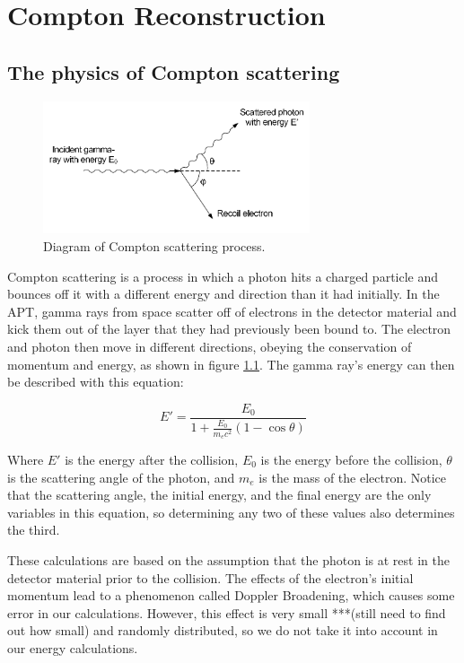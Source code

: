 %
\chapter{Compton Reconstruction}

\section{The physics of Compton scattering}

\begin{figure}
    \centering
    \includegraphics[width=0.7\textwidth]{Compton_scatter.png}
    \caption{Diagram of Compton scattering process. \cite{comptonThesis}}
    \label{fig:compton_scatter}
\end{figure}

Compton scattering is a process in which a photon hits a charged particle and bounces off it with a different energy and direction than it had initially. In the APT, gamma rays from space scatter off of electrons in the detector material and kick them out of the layer that they had previously been bound to. The electron and photon then move in different directions, obeying the conservation of momentum and energy, as shown in figure \ref{fig:compton_scatter}. The gamma ray's energy can then be described with this equation:

\begin{equation}
    \label{eq:compton}E' = \frac{E_0}{1+\frac{E_0}{m_ec^2}(1-\cos\theta)}
\end{equation}

Where $E'$ is the energy after the collision, $E_0$ is the energy before the collision, $\theta$ is the scattering angle of the photon, and $m_e$ is the mass of the electron. Notice that the scattering angle, the initial energy, and the final energy are the only variables in this equation, so determining any two of these values also determines the third.

These calculations are based on the assumption that the photon is at rest in the detector material prior to the collision. The effects of the electron's initial momentum lead to a phenomenon called Doppler Broadening, which causes some error in our calculations. However, this effect is very small ***(still need to find out how small) and randomly distributed, so we do not take it into account in our energy calculations.

